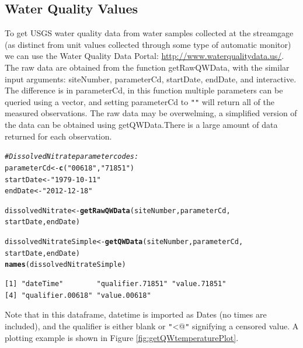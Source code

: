 \documentclass[a4paper,11pt]{article}\usepackage[]{graphicx}\usepackage[]{color}
\makeatletter
\newcommand{\hlstr}[1]{\textcolor[rgb]{0.192,0.494,0.8}{#1}}%
\newcommand{\hlcom}[1]{\textcolor[rgb]{0.678,0.584,0.686}{\textit{#1}}}%
\newcommand{\hlstd}[1]{\textcolor[rgb]{0.345,0.345,0.345}{#1}}%
\newcommand{\hlkwb}[1]{\textcolor[rgb]{0.69,0.353,0.396}{#1}}%
\newcommand{\hlkwd}[1]{\textcolor[rgb]{0.737,0.353,0.396}{\textbf{#1}}}%
\newenvironment{kframe}{%
 \def\at@end@of@kframe{}%
 \ifinner\ifhmode%
  \def\at@end@of@kframe{\end{minipage}}%
  \begin{minipage}{\columnwidth}%
 \fi\fi%
 \def\FrameCommand##1{\hskip\@totalleftmargin \hskip-\fboxsep
 \colorbox{shadecolor}{##1}\hskip-\fboxsep
     \hskip-\linewidth \hskip-\@totalleftmargin \hskip\columnwidth}%
 \MakeFramed {\advance\hsize-\width
   \@totalleftmargin\z@ \linewidth\hsize
   \@setminipage}}%
 {\par\unskip\endMakeFramed%
 \at@end@of@kframe}
\newenvironment{knitrout}{}{} %
\makeatother
\begin{document}
\subsection{Water Quality Values}
\label{sec:usgsWQP}
To get USGS water quality data from water samples collected at the streamgage (as distinct from unit values collected through some type of automatic monitor) we can use the Water Quality Data Portal: \url{http://www.waterqualitydata.us/}. The raw data are obtained from the function  getRawQWData, with the similar input arguments: siteNumber, parameterCd, startDate, endDate, and interactive. The difference is in parameterCd, in this function multiple parameters can be queried using a vector, and setting parameterCd to \texttt{"}\texttt{"} will return all of the measured observations. The raw data may be overwelming, a simplified version of the data can be obtained using getQWData.There is a large amount of data returned for each observation. 


\begin{knitrout}
\color{fgcolor}\begin{kframe}
\begin{alltt}
\hlcom{# Dissolved Nitrate parameter codes:}
\hlstd{parameterCd} \hlkwb{<-} \hlkwd{c}\hlstd{(}\hlstr{"00618"}\hlstd{,}\hlstr{"71851"}\hlstd{)}
\hlstd{startDate} \hlkwb{<-} \hlstr{"1979-10-11"}
\hlstd{endDate} \hlkwb{<-} \hlstr{"2012-12-18"}

\hlstd{dissolvedNitrate} \hlkwb{<-} \hlkwd{getRawQWData}\hlstd{(siteNumber, parameterCd,}
      \hlstd{startDate, endDate)}

\hlstd{dissolvedNitrateSimple} \hlkwb{<-} \hlkwd{getQWData}\hlstd{(siteNumber, parameterCd,}
        \hlstd{startDate, endDate)}
\hlkwd{names}\hlstd{(dissolvedNitrateSimple)}
\end{alltt}
\begin{verbatim}
[1] "dateTime"        "qualifier.71851" "value.71851"    
[4] "qualifier.00618" "value.00618"    
\end{verbatim}
\end{kframe}
\end{knitrout}

Note that in this dataframe, datetime is imported as Dates (no times are included), and the qualifier is either blank or \texttt{"}\verb@<@\texttt{"} signifying a censored value. A plotting example is shown in Figure \ref{fig:getQWtemperaturePlot}.
\end{document}
